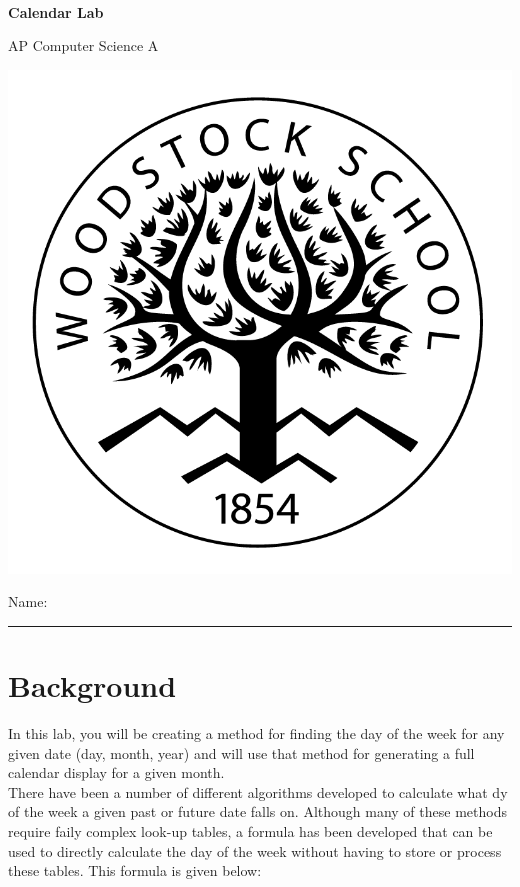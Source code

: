 

\def\LabCourse{AP Computer Science A}
\def\LabNumber{01}
\def\LabTitle{Calendar Lab}


	\begin{coverpages}
		\ \\[2cm]
		\begin{center}
			\huge
			\textbf{\LabTitle}

			\Large
			\LabCourse
		\end{center}

		\vspace{1.5cm}

		\begin{center}
			\includegraphics[scale=0.45]{graphics/logo_black}

			\vspace{2.5cm}

			\Large
			Name: \rule{11.5cm}{0.1pt}
		\end{center}
	\end{coverpages}

	\blankpage

	\thispagestyle{empty}
	\tableofcontents

	\pagebreak

	\section{Background}
		In this lab, you will be creating a method for finding the day of the week for any given date (day, month, year) and will use that method for generating a full calendar display for a given month.\\[\baselineskip]
		There have been a number of different algorithms developed to calculate what dy of the week a given past or future date falls on. Although many of these methods require faily complex look-up tables, a formula has been developed that can be used to directly calculate the day of the week without having to store or process these tables. This formula is given below:

